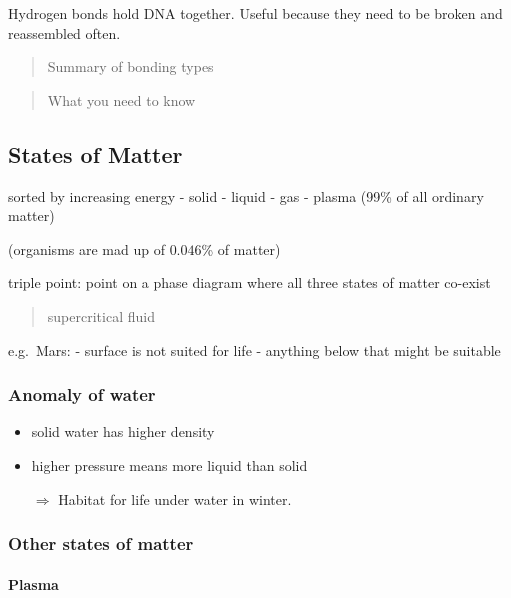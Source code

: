 Hydrogen bonds hold DNA together. Useful because they need to be broken
and reassembled often.

\begin{quote}
Summary of bonding types
\end{quote}

\begin{quote}
What you need to know
\end{quote}

\hypertarget{states-of-matter}{%
\subsection{States of Matter}\label{states-of-matter}}

sorted by increasing energy - solid - liquid - gas - plasma (99\% of all
ordinary matter)

(organisms are mad up of \(0.046\)\% of matter)

triple point: point on a phase diagram where all three states of matter
co-exist

\begin{quote}
supercritical fluid
\end{quote}

e.g.~Mars: - surface is not suited for life - anything below that might
be suitable

\hypertarget{anomaly-of-water}{%
\subsubsection{Anomaly of water}\label{anomaly-of-water}}

\begin{itemize}
\item
  solid water has higher density
\item
  higher pressure means more liquid than solid

  \(\Rightarrow\) Habitat for life under water in winter.
\end{itemize}

\hypertarget{other-states-of-matter}{%
\subsubsection{Other states of matter}\label{other-states-of-matter}}

\hypertarget{plasma}{%
\paragraph{Plasma}\label{plasma}}


